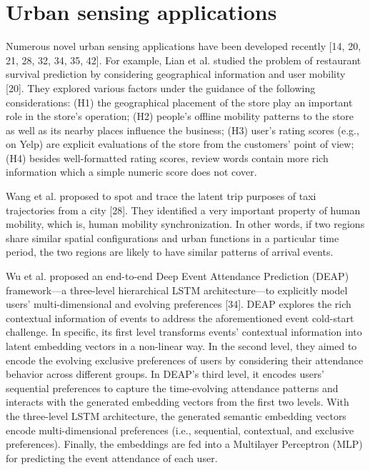 
\section{Urban sensing applications}
Numerous novel urban sensing applications have been developed
recently [14, 20, 21, 28, 32, 34, 35, 42]. For example, Lian et al. studied
the problem of restaurant survival prediction by considering geographical information and user mobility [20]. They explored various factors under the guidance of the following considerations: (H1) the geographical placement of the
store play an important role in the store’s operation; (H2)
people’s offline mobility patterns to the store as well as its nearby places influence the business; (H3) user’s rating scores
(e.g., on Yelp) are explicit evaluations of the store from the
customers’ point of view; (H4) besides well-formatted rating
scores, review words contain more rich information which a
simple numeric score does not cover.

\noindent Wang et al. proposed to spot and trace the latent trip purposes of taxi
trajectories from a city [28]. They identified a very important
property of human mobility, which is, human mobility synchronization. In other words, if two regions share similar spatial configurations and urban functions in a particular time period, the two regions are likely to have similar patterns of arrival events.

\noindent Wu et al. proposed an end-to-end Deep Event Attendance
Prediction (DEAP) framework—a three-level hierarchical LSTM architecture—to explicitly model users’ multi-dimensional and evolving preferences [34]. DEAP explores the rich contextual information of events to address the aforementioned event cold-start challenge. In specific, its first level transforms events’ contextual information into latent embedding vectors in a non-linear way. In the second level, they aimed to encode the evolving exclusive preferences of users by considering their attendance behavior across different groups. In DEAP’s third level, it encodes users’ sequential preferences to capture the time-evolving attendance patterns and interacts with the generated embedding vectors from the first two levels.
With the three-level LSTM architecture, the generated semantic embedding vectors encode multi-dimensional preferences (i.e., sequential, contextual, and exclusive preferences). Finally, the embeddings are fed into a Multilayer Perceptron (MLP) for predicting the event attendance of each user. 

